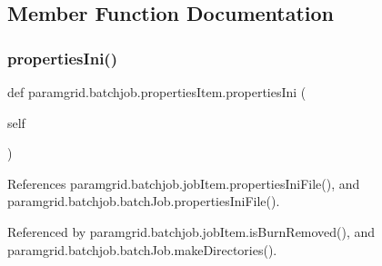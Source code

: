 \subsection{Member Function Documentation}
\mbox{\label{classparamgrid_1_1batchjob_1_1propertiesItem_af0d636693ae172d44b4bd11ecd7b2e26}} 
\subsubsection{\texorpdfstring{properties\+Ini()}{propertiesIni()}}
{\footnotesize\ttfamily def paramgrid.\+batchjob.\+properties\+Item.\+properties\+Ini (\begin{DoxyParamCaption}\item[{}]{self }\end{DoxyParamCaption})}



References paramgrid.\+batchjob.\+job\+Item.\+properties\+Ini\+File(), and paramgrid.\+batchjob.\+batch\+Job.\+properties\+Ini\+File().



Referenced by paramgrid.\+batchjob.\+job\+Item.\+is\+Burn\+Removed(), and paramgrid.\+batchjob.\+batch\+Job.\+make\+Directories().

